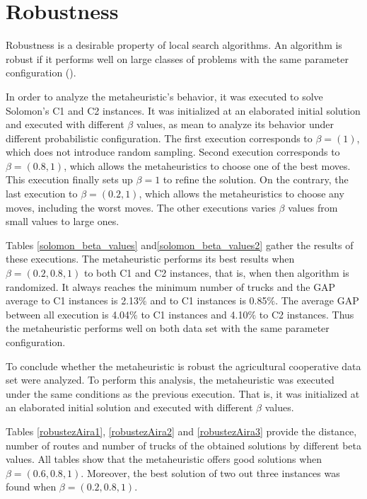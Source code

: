 \clearpage

\section{Robustness}\label{Robustness}

Robustness is a desirable property of local search algorithms. An algorithm is robust if it performs well on large classes of problems with the same parameter configuration (\cite{Bent}). 

In order to analyze the metaheuristic's behavior, it was executed to solve Solomon's C1 and C2 instances. It was initialized at an elaborated initial solution and executed with different $\beta$ values, as mean to analyze its behavior under different probabilistic configuration. The first execution corresponds to $\beta = (1)$, which does not introduce random sampling. Second execution corresponds to $\beta = (0.8, 1)$, which allows the metaheuristics to choose one of the best moves. This execution finally sets up $\beta = 1$ to refine the solution. On the contrary, the last execution to $\beta = (0.2, 1)$, which allows the metaheuristics to choose any moves, including the worst moves. The other executions varies $\beta$ values from small values to large ones.

Tables \ref{solomon_beta_values} and\ref{solomon_beta_values2} gather the results of these executions. The metaheuristic performs its best results when $\beta = (0.2, 0.8, 1)$ to both C1 and C2 instances, that is, when then algorithm is randomized. It always reaches the minimum number of trucks and the GAP average to C1 instances is 2.13$\%$ and to C1 instances is 0.85$\%$. The average GAP between all execution is 4.04$\%$ to C1 instances and 4.10$\%$ to C2 instances. Thus the metaheuristic performs well on both data set with the same parameter configuration. 


\clearpage

% 

To conclude whether the metaheuristic is robust the agricultural cooperative data set were analyzed. To perform this analysis, the metaheuristic was executed under the same conditions as the previous execution. That is, it was initialized at an elaborated initial solution and executed with different $\beta$ values.

Tables \ref{robustezAira1}, \ref{robustezAira2} and \ref{robustezAira3} provide the distance, number of routes and number of trucks of the obtained solutions by different beta values. All tables show that the metaheuristic offers good solutions when $\beta = (0.6, 0.8, 1)$. Moreover, the best solution of two out three instances was found when $\beta = (0.2, 0.8, 1)$.


